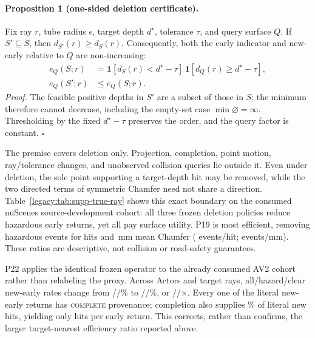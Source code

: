 \paragraph{Proposition 1 (one-sided deletion certificate).}
Fix ray $r$, tube radius $\epsilon$, target depth $d^\star$, tolerance $\tau$, and query surface $Q$. If $S'\subseteq S$, then
$d_{S'}(r)\ge d_S(r)$. Consequently, both the early indicator and new-early relative to $Q$ are non-increasing:
\begin{equation}
\begin{aligned}
e_Q(S;r)&=\mathbf 1[d_S(r)<d^\star-\tau]\,\mathbf 1[d_Q(r)\ge d^\star-\tau],\\
e_Q(S';r)&\le e_Q(S;r).
\end{aligned}
\end{equation}
\emph{Proof.} The feasible positive depths in $S'$ are a subset of those in $S$; the minimum therefore cannot decrease, including
the empty-set case $\min\varnothing=\infty$. Thresholding by the fixed $d^\star-\tau$ preserves the order, and the query factor is
constant. \hfill$\square$

The premise covers deletion only. Projection, completion, point motion, ray/tolerance changes, and unobserved collision queries lie
outside it. Even under deletion, the sole point supporting a target-depth hit may be removed, while the two directed terms of
symmetric Chamfer need not share a direction. Table~\ref{legacy:tab:supp-true-ray} shows this exact boundary on the consumed nuScenes
source-development cohort: all three frozen deletion policies reduce hazardous early returns, yet all pay surface utility. P19 is
most efficient, removing \PtwentyPnineteenHazardRemoved{} hazardous events for
\PtwentyPnineteenHitsLost{} hits and \PtwentyPnineteenPenaltyMM{}\,mm mean Chamfer
(\PtwentyPnineteenEventsPerHit{} events/hit; \PtwentyPnineteenEventsPerMM{} events/mm). These ratios are descriptive, not
collision or road-safety guarantees.

P22 applies the identical frozen operator to the already consumed AV2 cohort rather than relabeling the proxy. Across
\PtwentytwoActors{} Actors and \PtwentytwoRays{} target rays, all/hazard/clear new-early rates change from
\PtwentytwoProxyTotalEarly{}/\PtwentytwoProxyHazardEarly{}/\PtwentytwoProxyClearEarly{}\% to
\PtwentytwoTrueTotalEarly{}/\PtwentytwoTrueHazardEarly{}/\PtwentytwoTrueClearEarly{}\%, or
\PtwentytwoTotalRatio{}/\PtwentytwoHazardRatio{}/\PtwentytwoClearRatio{}$\times$. Every one of the
\PtwentytwoTrueNewEarly{} literal new-early returns has \textsc{complete} provenance; completion also supplies
\PtwentytwoCompleteNewHitShare{}\% of literal new hits, yielding only \PtwentytwoHitEarlyRatio{} hits per early return.
This corrects, rather than confirms, the larger target-nearest efficiency ratio reported above.

